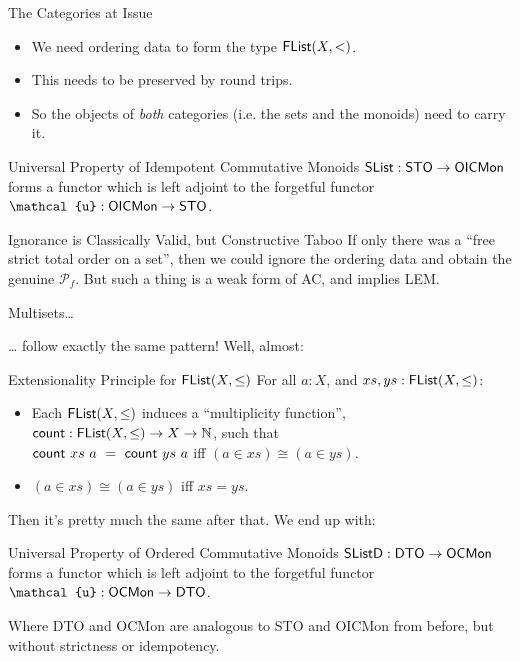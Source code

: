 \documentclass[handout]{beamer}
\begin{document}
\begin{frame}{The Categories at Issue}
\begin{itemize}
  \item We need ordering data to form the type $\AgdaDatatype{FList}(X,<)$.
  \item This needs to be preserved by round trips.
  \item So the objects of \emph{both} categories (i.e. the sets and the monoids) need to carry it.
\end{itemize}

\begin{block}{Universal Property of Idempotent Commutative Monoids}
   $\AgdaDatatype{SList} : \AgdaDatatype{STO} \to \AgdaDatatype{OICMon}$ forms a functor which is left adjoint to the forgetful functor $\AgdaDatatype{\ensuremath{\mathcal{u}}} : \AgdaDatatype{OICMon} \to \AgdaDatatype{STO}$.
\end{block}

\begin{block}{Ignorance is Classically Valid, but Constructive Taboo}
  If only there was a ``free strict total order on a set'', then we could ignore the ordering data and obtain the genuine $\mathcal{P}_{f}$.
  But such a thing is a weak form of AC, and implies LEM.
\end{block}
\end{frame}

\begin{frame}{Multisets\ldots{}}

  \ldots{} follow exactly the same pattern! Well, almost:

  \begin{block}{Extensionality Principle for $\AgdaDatatype{FList}(X, \leq)$}
    For all $a : X$, and $xs, ys : \AgdaDatatype{FList}(X, \leq)$:
  \begin{itemize}
    \item Each $\AgdaDatatype{FList}(X, \leq)$ induces a ``multiplicity function'', $\AgdaFunction{count} : \AgdaDatatype{FList}(X,\leq) \to X \to \mathbb{N}$, such that \\
          $\AgdaFunction{count}~xs~a~=~\AgdaFunction{count}~ys~a$ iff $(a \in xs) \cong (a \in ys) $.
    \item $(a \in xs) \cong (a \in ys)$ iff $xs = ys$.
  \end{itemize}
 \end{block}

 Then it's pretty much the same after that. We end up with:

 \begin{block}{Universal Property of Ordered Commutative Monoids}
   $\AgdaDatatype{SListD} : \AgdaDatatype{DTO} \to \AgdaDatatype{OCMon}$ forms a functor which is left adjoint to the forgetful functor $\AgdaDatatype{\ensuremath{\mathcal{u}}} : \AgdaDatatype{OCMon} \to \AgdaDatatype{DTO}$.
 \end{block}

 Where DTO and OCMon are analogous to STO and OICMon from before, but without strictness or idempotency.
\end{frame}
\end{document}
